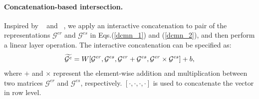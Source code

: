 \paragraph{Concatenation-based intersection.} Inspired by ~\cite{liu2016learning} and ~\cite{reimers2019sentence}, we apply an interactive concatenation to pair of the representations $\mathcal{G}^{er}$ and $\mathcal{G}^{es}$ in Eqs.(\ref{dcmn_1}) and (\ref{dcmn_2}), and then perform a linear layer operation. The interactive concatenation can be specified as:
\begin{equation}
\setlength{\abovedisplayskip}{-2pt}
\setlength{\belowdisplayskip}{-2pt}
\widetilde{\mathcal{G}^{e}} = W[\mathcal{G}^{er}, \mathcal{G}^{es}, \mathcal{G}^{er}+\mathcal{G}^{es}, \mathcal{G}^{er}\times\mathcal{G}^{es}] + b,
\end{equation}
where $+$ and $\times$ represent the element-wise addition and multiplication between two matrices $\mathcal{G}^{er}$ and $\mathcal{G}^{es}$, respectively. $[\cdot, \cdot, \cdot, \cdot]$ is used to concatenate the vector in row level.



